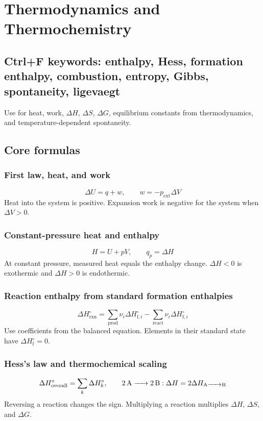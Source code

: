 \section{Thermodynamics and Thermochemistry}

\subsection{Ctrl+F keywords: enthalpy, Hess, formation enthalpy, combustion, entropy, Gibbs, spontaneity, ligevaegt}
Use for heat, work, \(\Delta H\), \(\Delta S\), \(\Delta G\), equilibrium constants from thermodynamics, and temperature-dependent spontaneity.

\subsection{Core formulas}

\subsubsection{First law, heat, and work}
\[
\Delta U=q+w, \qquad w=-p_{\mathrm{ext}}\Delta V
\]
Heat into the system is positive. Expansion work is negative for the system when \(\Delta V>0\).

\subsubsection{Constant-pressure heat and enthalpy}
\[
H=U+pV, \qquad q_p=\Delta H
\]
At constant pressure, measured heat equals the enthalpy change. \(\Delta H<0\) is exothermic and \(\Delta H>0\) is endothermic.

\subsubsection{Reaction enthalpy from standard formation enthalpies}
\[
\boxed{\Delta H^\circ_{\mathrm{rxn}}=
\sum_{\mathrm{prod}}\nu_i\Delta H^\circ_{\mathrm f,i}
-\sum_{\mathrm{react}}\nu_i\Delta H^\circ_{\mathrm f,i}}
\]
Use coefficients from the balanced equation. Elements in their standard state have \(\Delta H^\circ_{\mathrm f}=0\).

\subsubsection{Hess's law and thermochemical scaling}
\[
\Delta H^\circ_{\mathrm{overall}}=\sum_k \Delta H^\circ_k, \qquad
\ce{2A -> 2B}: \Delta H=2\Delta H_{\ce{A -> B}}
\]
Reversing a reaction changes the sign. Multiplying a reaction multiplies \(\Delta H\), \(\Delta S\), and \(\Delta G\).

